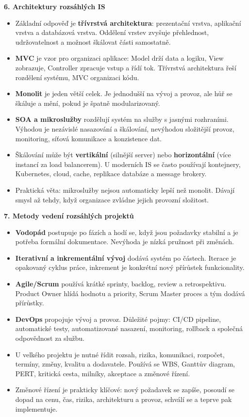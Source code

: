 \documentclass[11pt,a4paper]{article}
\begin{document}
\textbf{6. Architektury rozsáhlých IS}
\begin{itemize}
  \item Základní odpověď je \textbf{třívrstvá architektura}: prezentační vrstva, aplikační vrstva a databázová vrstva. Oddělení vrstev zvyšuje přehlednost, udržovatelnost a možnost škálovat části samostatně.
  \item \textbf{MVC} je vzor pro organizaci aplikace: Model drží data a logiku, View zobrazuje, Controller zpracuje vstup a řídí tok. Třívrstvá architektura řeší rozdělení systému, MVC organizaci kódu.
  \item \textbf{Monolit} je jeden větší celek. Je jednodušší na vývoj a provoz, ale hůř se škáluje a mění, pokud je špatně modularizovaný.
  \item \textbf{SOA a mikroslužby} rozdělují systém na služby s jasnými rozhraními. Výhodou je nezávislé nasazování a škálování, nevýhodou složitější provoz, monitoring, síťová komunikace a konzistence dat.
  \item Škálování může být \textbf{vertikální} (silnější server) nebo \textbf{horizontální} (více instancí za load balancerem). U moderních IS se často používají kontejnery, Kubernetes, cloud, cache, replikace databáze a message brokery.
  \item Praktická věta: mikroslužby nejsou automaticky lepší než monolit. Dávají smysl až tehdy, když organizace zvládne jejich provozní složitost.
\end{itemize}

\textbf{7. Metody vedení rozsáhlých projektů}
\begin{itemize}
  \item \textbf{Vodopád} postupuje po fázích a hodí se, když jsou požadavky stabilní a je potřeba formální dokumentace. Nevýhoda je nízká pružnost při změnách.
  \item \textbf{Iterativní a inkrementální vývoj} dodává systém po částech. Iterace je opakovaný cyklus práce, inkrement je konkrétní nový přírůstek funkcionality.
  \item \textbf{Agile/Scrum} používá krátké sprinty, backlog, review a retrospektivu. Product Owner hlídá hodnotu a priority, Scrum Master proces a tým dodává přírůstky.
  \item \textbf{DevOps} propojuje vývoj a provoz. Důležité pojmy: CI/CD pipeline, automatické testy, automatizované nasazení, monitoring, rollback a společná odpovědnost za službu.
  \item U velkého projektu je nutné řídit rozsah, rizika, komunikaci, rozpočet, termíny, změny, kvalitu a dodavatele. Používá se WBS, Ganttův diagram, PERT, kritická cesta, milníky, akceptace a změnové řízení.
  \item Změnové řízení je prakticky klíčové: nový požadavek se zapíše, posoudí se dopad na cenu, čas, rizika, architekturu a provoz, schválí se a teprve pak implementuje.
\end{itemize}
\end{document}

